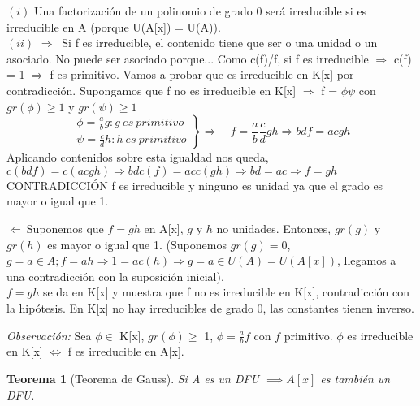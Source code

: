 \documentclass[11pt, a4paper, titlepage]{article}
\makeatletter
\newif\IfInSansMode
\let\oldsf\sffamily
\renewcommand*{\sffamily}{\oldsf\mathversion{sans}\InSansModetrue}
\let\oldnorm\normalfont
\renewcommand*{\normalfont}{\oldnorm\InSansModefalse\mathversion{normal}}
\renewenvironment{proof}[1][\proofname] {\vspace{-15pt}\par\pushQED{\qed}\normalfont\topsep6\p@\@plus6\p@\relax\trivlist\item[\hskip\labelsep\it#1\@addpunct{.}]\ignorespaces}{\popQED\endtrivlist\@endpefalse}
\renewenvironment{proof}[1][\proofname] {\par\pushQED{\qed}\normalfont\topsep6\p@\@plus6\p@\relax\trivlist\item[\hskip\labelsep\itshape\sffamily#1\@addpunct{.}]\ignorespaces}{\popQED\endtrivlist\@endpefalse}
\theoremstyle{theorem-style}
\newtheorem{nth}{Teorema}[section]
\theoremstyle{definition-style}
\theoremstyle{remark-style}
\theoremstyle{example-style}
\makeatother
\begin{document}
\begin{proof}
$(i)$ Una factorización de un polinomio de grado 0 será irreducible si es irreducible en A (porque U(A[x]) = U(A)).\\
$(ii)$ $\displaystyle \boxed{\Rightarrow}\ $ Si f es irreducible, el contenido tiene que ser o una unidad o un asociado. No puede ser asociado porque...
Como c(f)/f, si f es irreducible $\Rightarrow$ c(f) = 1 $\Rightarrow$ f es primitivo. Vamos a probar que es irreducible en K[x] por contradicción. Supongamos que f no es irreducible en K[x] $\Rightarrow$ f = $\phi \psi$ con $gr(\phi) \geq 1$ y $gr(\psi) \geq 1$
$$
 \left .
      \begin{matrix}
        \phi =  \frac{a}{b}g : g\ es\ primitivo\\
        \psi =  \frac{c}{d}h : h\ es\ primitivo
      \end{matrix}
   \right \}
   \Longrightarrow \quad f = \frac{a}{b} \frac{c}{d} gh \Rightarrow bdf = acgh
  $$
  Aplicando contenidos sobre esta igualdad nos queda, $c(bdf) = c(acgh) \Rightarrow bdc(f) = acc(gh) \Rightarrow bd = ac \Rightarrow f = gh $ CONTRADICCIÓN f es irreducible y ninguno es unidad ya que el grado es mayor o igual que 1.

$\displaystyle \boxed{\Leftarrow}\ $Suponemos que $f=gh$ en A[x], $g$ y $h$ no unidades. Entonces, $gr(g)$ y $gr(h)$ es mayor o igual que 1. (Suponemos $gr(g)=0$, $g = a \in A; f=ah \Rightarrow 1 = ac(h) \Rightarrow g=a \in U(A)=U(A[x])$, llegamos a una contradicción con la suposición inicial).  \\
$f=gh$ se da en K[x] y muestra que f no es irreducible en K[x], contradicción con la hipótesis.
En K[x] no hay irreducibles de grado 0, las constantes tienen inverso.
\end{proof}

\textit{Observación:} Sea $\phi \in$ K[x], $gr(\phi) \geq$ 1, $\phi=\frac{a}{b}f$ con $f$ primitivo. $\phi$ es irreducible en K[x] $\Leftrightarrow$ f es irreducible en A[x].

\begin{nth}[Teorema de Gauss]
	Si A es un DFU $\implies A[x]$ es también un DFU.
\end{nth}
\end{document}
